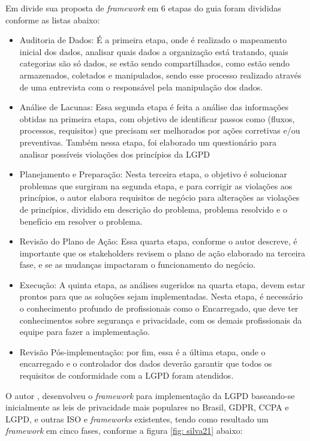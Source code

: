 \documentclass[
	12pt,				%
	openright,			%
	oneside,			%
	a4paper,			%
	english,			%
	french,				%
	spanish,			%
	brazil,				%
	]{abntex2}
\begin{document}
Em  divide sua proposta de \textit{framework} em 6 etapas do guia foram divididas conforme as listas abaixo:
\begin{itemize}
\item Auditoria de Dados: É a primeira etapa, onde é realizado o mapeamento inicial dos dados, analisar quais dados a organização está tratando, quais categorias são só dados, se estão sendo compartilhados, como estão sendo armazenados, coletados e manipulados, sendo esse processo realizado através de uma entrevista com o responsável pela manipulação dos dados.
\item Análise de Lacunas: Essa segunda etapa é feita a análise das informações obtidas na primeira etapa, com objetivo de identificar passos como (fluxos, processos, requisitos) que precisam ser melhorados por ações corretivas e/ou preventivas. Também nessa etapa, foi elaborado um questionário para analisar possíveis violações dos princípios da LGPD
\item Planejamento e Preparação: Nesta terceira etapa, o objetivo é solucionar problemas que surgiram na segunda etapa, e para corrigir as violações aos princípios, o autor elabora requisitos de negócio para alterações as violações de princípios, dividido em descrição do problema, problema resolvido e o benefício em resolver o problema. 
\item Revisão do Plano de Ação: Essa quarta etapa, conforme o autor descreve, é importante que os stakeholders revisem o plano de ação elaborado na terceira fase, e se as mudanças impactaram o funcionamento do negócio.
\item Execução: A quinta etapa, as análises sugeridos na quarta etapa, devem estar prontos para que as soluções sejam implementadas. Nesta etapa, é necessário o conhecimento profundo de profissionais como o Encarregado, que deve ter conhecimentos sobre segurança e privacidade, com os demais profissionais da equipe para fazer a implementação.
\item Revisão Pós-implementação: por fim, essa é a última etapa, onde o encarregado e o controlador dos dados deverão garantir que todos os requisitos de conformidade com a LGPD foram atendidos.
\end{itemize}




O autor , desenvolveu o \textit{framework} para implementação da LGPD baseando-se inicialmente as leis de privacidade mais populares no Brasil, GDPR, CCPA e LGPD, e outras ISO e \textit{frameworks} existentes, tendo como resultado um \textit{framework} em cinco fases, conforme a figura \ref{fig: silva21} abaixo:
\end{document}
